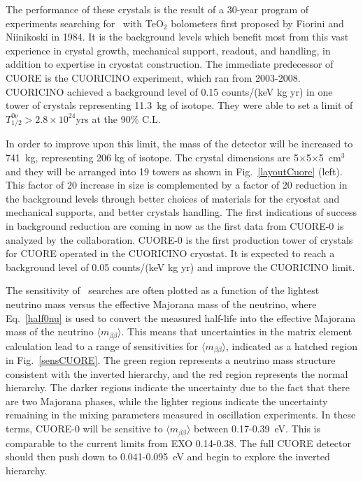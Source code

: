 The performance of these crystals is the result of a 30-year program of experiments searching for \zeronu~with TeO$_{2}$ bolometers first proposed by Fiorini and Niinikoski  in 1984\cite{Fiorini198483}. It is the background levels which benefit most from this vast experience in crystal growth, mechanical support, readout, and handling, in addition to expertise in cryostat construction. The immediate predecessor of CUORE is the CUORICINO experiment, which ran from 2003-2008.  CUORICINO achieved a background level of 0.15 counts/(keV kg yr) in one tower of crystals representing 11.3~kg of isotope. They were able to set a limit of $T_{1/2}^{0\nu} > 2.8\times10^{24}$yrs at the 90\% C.L.

In order to improve upon this limit, the mass of the detector will be increased to 741~kg, representing  206 kg of isotope. The crystal dimensions are 5$\times$5$\times$5~cm$^{3}$ and they will be arranged into 19 towers as shown in Fig.~\ref{layoutCuore} (left). This factor of 20 increase in size is complemented by a factor of 20 reduction in the background levels through better choices of materials for the cryostat and mechanical supports, and better crystals handling. The first indications of success in background reduction are coming in now as the first data from CUORE-0 is analyzed by the collaboration. CUORE-0 is the first production tower of crystals for CUORE operated in the CUORICINO cryostat. It is expected to reach a background level of 0.05 counts/(keV kg yr) and improve the CUORICINO limit.

The sensitivity of \zeronu~searches are often plotted as a function of the lightest neutrino mass versus the effective Majorana mass of the neutrino, where Eq.~\ref{half0nu} is used to convert the measured half-life into the effective Majorana mass of the neutrino $\langle m_{\beta\beta} \rangle$. This means that uncertainties in the matrix element calculation lead to a range of sensitivities for $\langle m_{\beta\beta} \rangle$, indicated as a hatched region in Fig.~\ref{sensCUORE}. The green region represents a neutrino mass structure consistent with the inverted hierarchy, and the red region represents the normal hierarchy. The darker regions indicate the uncertainty due to the fact that there are two Majorana phases, while the lighter regions indicate the uncertainty remaining in the mixing parameters measured in oscillation experiments. In these terms, CUORE-0 will be sensitive to $\langle m_{\beta\beta} \rangle$ between 0.17-0.39~eV. This is comparable to the current limits from EXO 0.14-0.38\cite{EXO2012}. The full CUORE detector should then push down to 0.041-0.095~eV and begin to explore the inverted hierarchy.

